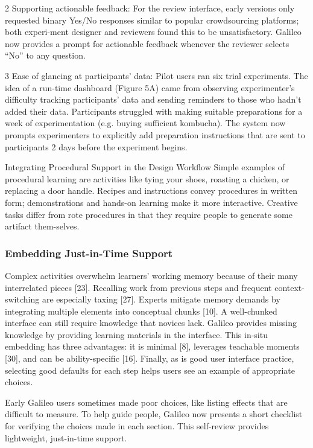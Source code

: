 2 Supporting actionable feedback: For the review interface, early versions only requested binary Yes/No responses similar to popular crowdsourcing platforms; both experi-ment designer and reviewers found this to be unsatisfactory. Galileo now provides a prompt for actionable feedback whenever the reviewer selects “No” to any question. 

3 Ease of glancing at participants’ data: Pilot users ran six trial experiments. The idea of a run-time dashboard (Figure 5A) came from observing experimenter’s difficulty tracking participants’ data and sending reminders to those who hadn’t added their data. Participants struggled with making suitable preparations for a week of experimentation (e.g. buying sufficient kombucha). The system now prompts experimenters to explicitly add preparation instructions that are sent to participants 2 days before the experiment begins. 

Integrating Procedural Support in the Design Workflow
Simple examples of procedural learning are activities like tying your shoes, roasting a chicken, or replacing a door handle. Recipes and instructions convey procedures in written form; demonstrations and hands-on learning make it more interactive. Creative tasks differ from rote procedures in that they require people to generate some artifact them-selves.

\subsubsection{Embedding Just-in-Time Support}
Complex activities overwhelm learners’ working memory because of their many interrelated pieces [23]. Recalling work from previous steps and frequent context-switching are especially taxing [27]. Experts mitigate memory demands by integrating multiple elements into conceptual chunks [10]. A well-chunked interface can still require knowledge that novices lack. Galileo provides missing knowledge by providing learning materials in the interface. This in-situ embedding has three advantages: it is minimal [8], leverages teachable moments [30], and can be ability-specific [16]. Finally, as is good user interface practice, selecting good defaults for each step helps users see an example of appropriate choices. 

Early Galileo users sometimes made poor choices, like listing effects that are difficult to measure. To help guide people, Galileo now presents a short checklist for verifying the choices made in each section. This self-review provides lightweight, just-in-time support.

